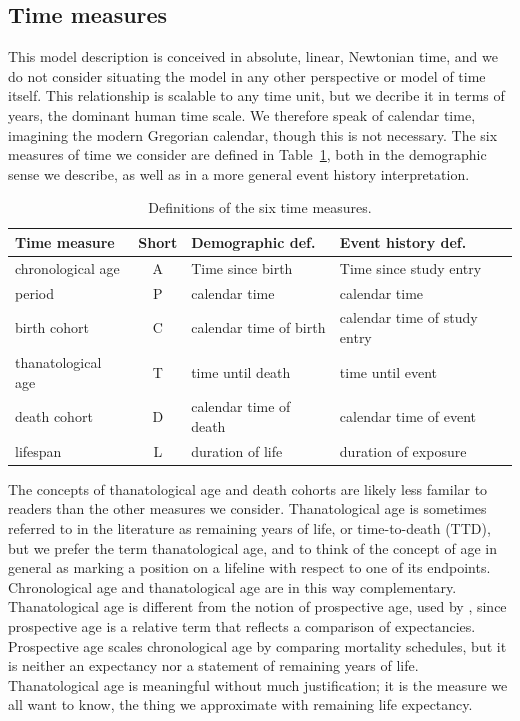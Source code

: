 \documentclass[11pt,oneside,a4paper]{article} %
\begin{document}
\subsection*{Time measures}
\FloatBarrier
This model description is conceived in absolute, linear, Newtonian time, and we
do not consider situating the model in any other perspective or model of time
itself.
This relationship is scalable to any time unit, but we decribe it in terms of
years, the dominant human time scale. We therefore speak of calendar time,
imagining the modern Gregorian calendar, though this is not necessary. The six
measures of time we consider are defined in Table~\ref{tab:sixdefs}, both in the
demographic sense we describe, as well as in a more general event history
interpretation.

\begin{table}
\centering
\caption{Definitions of the six time measures.}
\label{tab:sixdefs}
\begin{tabular}{lcll}
\hline 
\textbf{Time measure} & \textbf{Short} & \textbf{Demographic def.} &
\textbf{Event history def.}\\
\hline 
chronological age & A & Time since birth & Time since study entry \\
period & P & calendar time & calendar time \\
birth cohort & C & calendar time of birth & calendar time of study entry \\
thanatological age & T & time until death & time until event \\
death cohort & D & calendar time of death & calendar time of event \\
lifespan & L & duration of life & duration of exposure \\
\end{tabular}
\end{table}


The concepts of thanatological age and death cohorts are likely less familar to
readers than the other measures we consider. Thanatological age is sometimes
referred to in the literature as remaining years of life, or time-to-death
(TTD), but we prefer the term thanatological age, and to think of the concept of
age in general as marking a position on a lifeline with respect to one of its
endpoints.
Chronological age and thanatological age are in this way complementary. Thanatological age is
different from the notion of prospective age, used by
\citet{sanderson2007new}, since prospective age is a relative term that reflects
a comparison of expectancies. Prospective age scales chronological age by
comparing mortality schedules, but it is neither an expectancy nor a statement
of remaining years of life. Thanatological age is meaningful without much
justification; it is the measure we all want to know, the thing we approximate
with remaining life expectancy.
\end{document}
